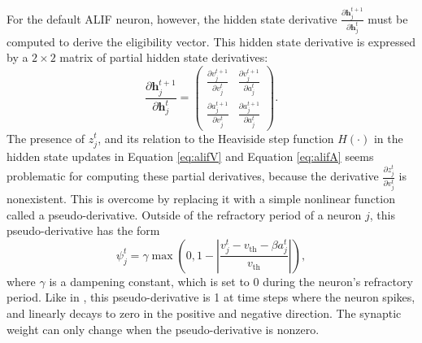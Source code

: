            For the default ALIF neuron, however, the hidden state derivative $\frac{\partial\mathbf{h}^{t+1}_j}{\partial\mathbf{h}^t_j}$ must be computed to derive the eligibility vector.
            This hidden state derivative is expressed by a $2\times2$ matrix of partial hidden state derivatives:
            \begin{equation}
            \frac{\partial\mathbf{h}^{t+1}_j}{\partial\mathbf{h}^t_j} = \begin{pmatrix}
            \frac{\partial v^{t+1}_j}{\partial v^t_j} & \frac{\partial v^{t+1}_j}{\partial a^t_j}\\
            \frac{\partial a^{t+1}_j}{\partial v^t_j} & \frac{\partial a^{t+1}_j}{\partial a^t_j}
            \end{pmatrix}.
            \end{equation}
            The presence of $z^t_j$, and its relation to the Heaviside step function $H(\cdot)$ in the hidden state updates in Equation \ref{eq:alifV} and Equation \ref{eq:alifA} seems problematic for computing these partial derivatives, because the derivative $\frac{\partial z^t_j}{\partial v^t_j}$ is nonexistent.
            This is overcome by replacing it with a simple nonlinear function called a pseudo-derivative.
            Outside of the refractory period of a neuron $j$, this pseudo-derivative has the form
            \begin{equation}
            \psi_j^t = \gamma \max\left(0, 1 - \left|\frac{v_j^t - v_\text{th} - \beta a^t_j}{v_\text{th}}\right|\right),
            \end{equation}
            where $\gamma$ is a dampening constant, which is set to 0 during the neuron's refractory period.
            Like in \citet{esser2016convolutional}, this pseudo-derivative is 1 at time steps where the neuron spikes, and linearly decays to zero in the positive and negative direction.
            The synaptic weight can only change when the pseudo-derivative is nonzero.

